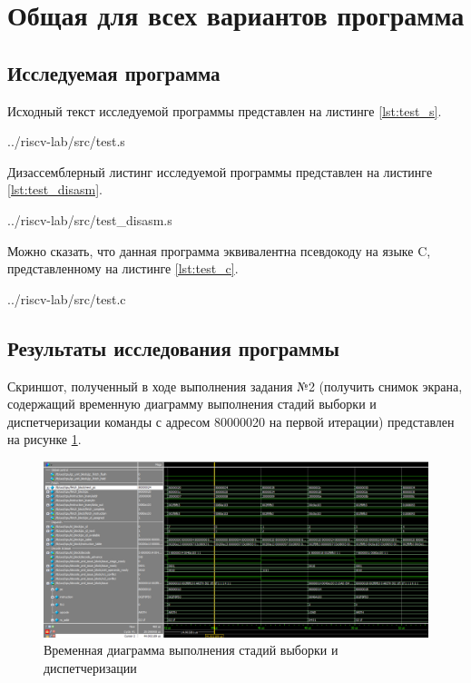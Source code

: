 \section{Общая для всех вариантов программа}

\subsection{Исследуемая программа}

Исходный текст исследуемой программы представлен на листинге \ref{lst:test_s}.
\begin{lstinputlisting}[
	label={lst:test_s},
	caption={Исходный текст общей программы},
	]{../riscv-lab/src/test.s}
\end{lstinputlisting}
\newpage

Дизассемблерный листинг исследуемой программы представлен на листинге \ref{lst:test_disasm}.
\begin{lstinputlisting}[
	label={lst:test_disasm},
	caption={Дизассемблерный листинг общей программы},
	]{../riscv-lab/src/test_disasm.s}
\end{lstinputlisting}
\newpage

Можно сказать, что данная программа эквивалентна псевдокоду на языке C, представленному на листинге \ref{lst:test_c}.
\begin{lstinputlisting}[
	label={lst:test_c},
	language=C,
	caption={Псевдокод на языке С},
	]{../riscv-lab/src/test.c}
\end{lstinputlisting}
\newpage


\subsection{Результаты исследования программы}

Скриншот, полученный в ходе выполнения задания №2 (получить снимок экрана, содержащий временную диаграмму выполнения стадий выборки и диспетчеризации команды с адресом 80000020 на первой итерации) представлен на рисунке \ref{fig:task280000020}.

\begin{figure}
	\centering
	\includegraphics[width=1\linewidth]{../images/task2_80000020}
	\caption{Временная диаграмма выполнения стадий выборки и диспетчеризации}
	\label{fig:task280000020}
\end{figure}

